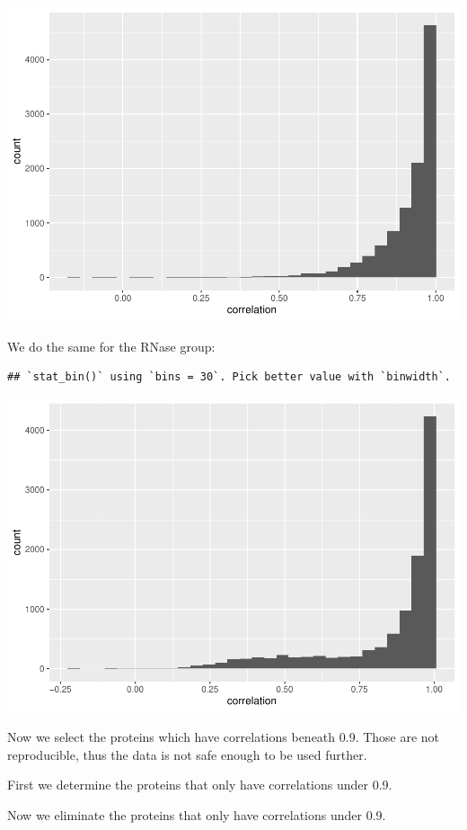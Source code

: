 \documentclass[
]{article}
\begin{document}
\includegraphics{Latextry_files/figure-latex/unnamed-chunk-11-1.pdf}

We do the same for the RNase group:

\begin{verbatim}
## `stat_bin()` using `bins = 30`. Pick better value with `binwidth`.
\end{verbatim}

\includegraphics{Latextry_files/figure-latex/unnamed-chunk-12-1.pdf}

Now we select the proteins which have correlations beneath 0.9. Those
are not reproducible, thus the data is not safe enough to be used
further.

First we determine the proteins that only have correlations under 0.9.

Now we eliminate the proteins that only have correlations under 0.9.
\end{document}
